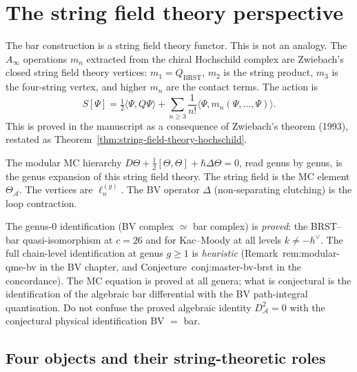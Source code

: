 \documentclass[11pt]{article}
\newcommand{\cA}{\mathcal{A}}
\begin{document}
\section{The string field theory perspective}
\label{sec:sft-perspective}

The bar construction is a string field theory functor.  This is
not an analogy.  The $A_\infty$ operations $m_n$ extracted from the
chiral Hochschild complex are Zwiebach's closed string field theory
vertices: $m_1 = Q_{\mathrm{BRST}}$, $m_2$ is the string product,
$m_3$ is the four-string vertex, and higher $m_n$ are the contact
terms.  The action is
\[
S[\Psi] = \tfrac{1}{2}\langle \Psi, Q\Psi \rangle
+ \sum_{n \geq 3} \frac{1}{n!}
  \langle \Psi, m_n(\Psi, \ldots, \Psi) \rangle.
\]
This is proved in the manuscript as a consequence of Zwiebach's
theorem (1993), restated as
Theorem~\ref{thm:string-field-theory-hochschild}.

The modular MC hierarchy
$D\Theta + \tfrac{1}{2}[\Theta,\Theta] + \hbar\Delta\Theta = 0$,
read genus by genus, is the genus expansion of this string field
theory.  The string field is the MC element $\Theta_\cA$.  The
vertices are $\ell_n^{(g)}$.  The BV operator $\Delta$
(non-separating clutching) is the loop contraction.

\begin{warning}
\label{warn:sft-heuristic}
The genus-$0$ identification (BV complex $\simeq$ bar complex) is
\emph{proved}: the BRST--bar quasi-isomorphism at $c = 26$ and for
Kac--Moody at all levels $k \neq -h^\vee$.  The full chain-level
identification at genus $g \geq 1$ is \emph{heuristic}
(Remark~\textup{rem:modular-qme-bv} in the BV chapter, and
Conjecture~\textup{conj:master-bv-brst} in the concordance).
The MC equation is proved at all genera; what is conjectural is
the identification of the algebraic bar differential with the
BV path-integral quantisation.  Do not confuse the proved
algebraic identity $D_\cA^2 = 0$ with the conjectural physical
identification BV $=$ bar.
\end{warning}


\subsection{Four objects and their string-theoretic roles}
\label{subsec:four-objects-sft}
\end{document}
